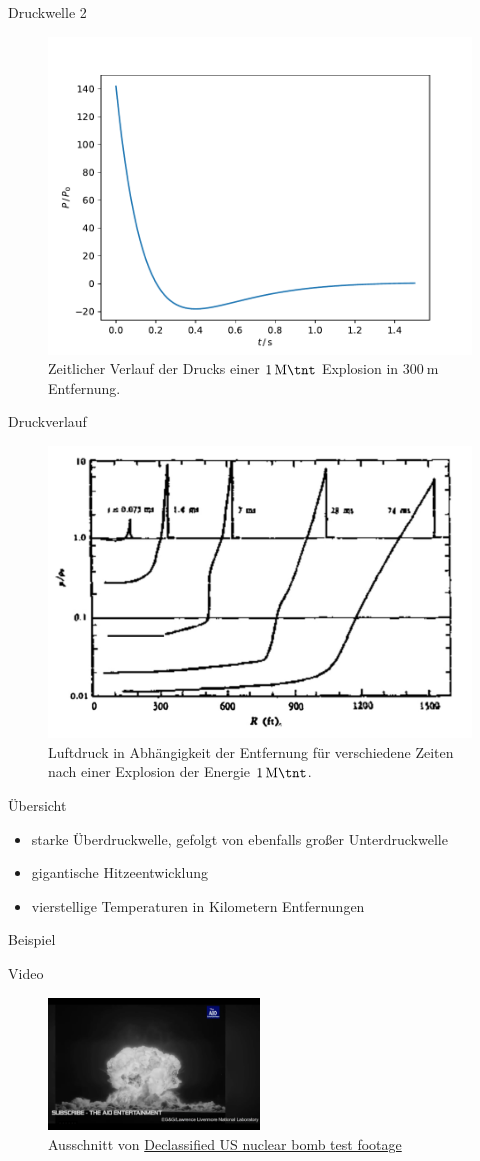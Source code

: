 \begin{frame}{Druckwelle 2}
\begin{figure}
	\includegraphics[width=0.5\linewidth]{img/fried.pdf}
	\caption{Zeitlicher Verlauf der Drucks einer $\SI{1}{\mega \tnt}$ Explosion in $\SI{300}{\meter}$ Entfernung.}
\end{figure}
\end{frame}
\begin{frame}{Druckverlauf}
	\begin{figure}
		\centering
		\includegraphics[width=0.5\linewidth]{img/img2.jpg}
		\caption{Luftdruck in Abhängigkeit der Entfernung für verschiedene Zeiten nach einer Explosion der Energie $\SI{1}{\mega \tnt}$.\cite{AnnuRev18_1}}
	\end{figure}
\end{frame}
\begin{frame}{Übersicht}
	\begin{itemize}
		\item starke Überdruckwelle, gefolgt von ebenfalls großer Unterdruckwelle
		\item gigantische Hitzeentwicklung
		\item vierstellige Temperaturen in Kilometern Entfernungen
	\end{itemize}
\end{frame}
\begin{frame}{Beispiel}
	\begin{block}{Video}
		\begin{figure}
			\centering
			\includegraphics[width=0.5\textwidth]{img/us_nuclear_test.jpg}
			\caption{Ausschnitt von \href{https://www.youtube.com/watch?v=E3xnUE8KzwM}{Declassified US nuclear bomb test footage} }
		\end{figure}
	\end{block}
\end{frame}

